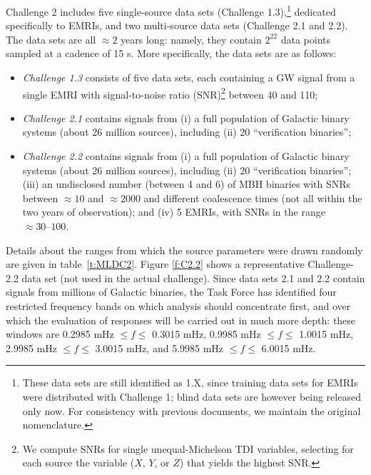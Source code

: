 \documentclass{iopart}
\begin{document}
Challenge 2 includes five single-source data sets (Challenge 1.3),\footnote{These data sets are still identified as 1.X, since training data sets for EMRIs were distributed with Challenge 1; blind data sets are however being released only now. For consistency with previous documents, we maintain the original nomenclature.} dedicated specifically to EMRIs, and two multi-source data sets (Challenge 2.1 and 2.2). The data sets are all $\approx 2$ years long: namely, they contain $2^{22}$ data points sampled at a cadence of 15 s. More specifically, the data sets are as follows: 
%
\begin{itemize}
\item \emph{Challenge 1.3} consists of five data sets, each containing a GW signal from a single EMRI with signal-to-noise ratio (SNR)\footnote{We compute SNRs for single unequal-Michelson TDI variables, selecting for each source the variable ($X$, $Y$, or $Z$) that yields the highest SNR.} between 40 and 110;
\item \emph{Challenge 2.1} contains signals from (i) a full population of Galactic binary systems (about 26 million sources), including (ii) 20 ``verification binaries'';
\item \emph{Challenge 2.2} contains signals from (i) a full population of Galactic binary systems (about 26 million sources), including (ii) 20 ``verification binaries''; (iii) an undisclosed number (between 4 and 6) of MBH binaries with SNRs between $\approx 10$ and $\approx 2000$ and different coalescence times (not all within the two years of observation); and (iv) 5 EMRIs, with SNRs in the range $\approx 30\mbox{--}100$.
\end{itemize}
%
Details about the ranges from which the source parameters were drawn randomly are given in table~\ref{t:MLDC2}. Figure \ref{f:C2.2} shows a representative Challenge-2.2 data set (not used in the actual challenge). Since data sets 2.1 and 2.2 contain signals from millions of Galactic binaries, the Task Force has identified four restricted frequency bands on which analysis should concentrate first, and over which the evaluation of responses will be carried out in much more depth: these windows  are 0.2985 mHz $\le f \le$ 0.3015 mHz, 0.9985 mHz $\le f \le$ 1.0015 mHz, 2.9985 mHz $\le f \le$ 3.0015 mHz, and 5.9985 mHz $\le f \le$ 6.0015 mHz.  
%
\end{document}
